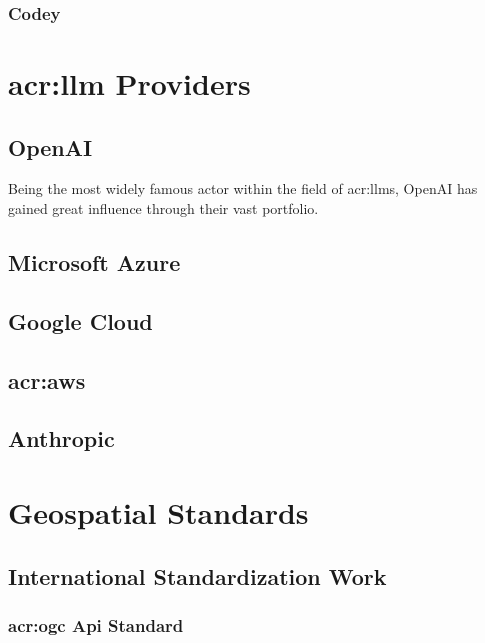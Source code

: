 \subsubsection{Codey}


\section[LLM providers]{\acrfull{acr:llm} Providers}\label{sec:llm-providers}

\subsection{OpenAI}\label{subsec:openai}

Being the most widely famous actor within the field of \glspl{acr:llm}, OpenAI has gained great influence through their vast portfolio.

\subsection{Microsoft Azure}\label{subsec:microsoft-azure}

\subsection{Google Cloud}\label{subsec:google-cloud}

\subsection[Amazon Web Services (AWS)]{\acrfull{acr:aws}}\label{subsec:aws}

\subsection{Anthropic}\label{subsec:anthropic}

\section{Geospatial Standards}\label{sec:geospatial-standards}

\subsection{International Standardization Work}\label{subsec:standardization-international}

\subsubsection[OGC Standards]{\acrshort{acr:ogc} Api Standard}\label{subsubsec:ogc}

